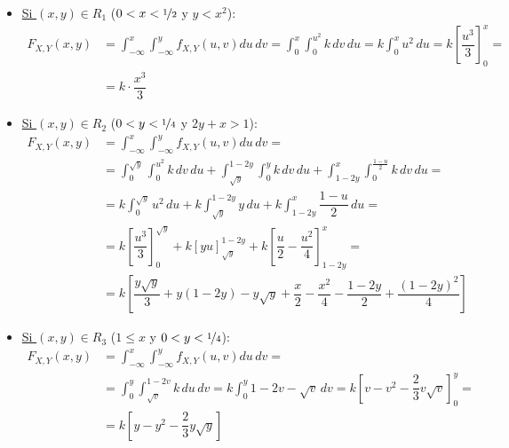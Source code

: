 \documentclass[12pt]{article}
\begin{document}
\begin{ejercicio}[5 puntos]
\begin{enumerate}
\begin{itemize}
                \item \ul{Si $(x,y) \in R_1$} ($0<x<\nicefrac{1}{2}$ y $y<x^2$):
                \begin{align*}
                    F_{X,Y}(x,y) &= \int_{-\infty}^x\int_{-\infty}^y f_{X,Y}(u,v)du\,dv
                    = \int_{0}^x\int_0^{u^2} k\,dv\,du
                    = k\int_{0}^x u^2\,du
                    = k\left[\dfrac{u^3}{3}\right]_{0}^x
                    =\\&= k\cdot \dfrac{x^3}{3}
                \end{align*}

                \item \ul{Si $(x,y) \in R_2$} ($0<y<\nicefrac{1}{4}$ y $2y+x>1$):
                \begin{align*}
                    F_{X,Y}(x,y) &= \int_{-\infty}^x\int_{-\infty}^y f_{X,Y}(u,v)du\,dv
                    =\\&= \int_0^{\sqrt{y}}\int_{0}^{u^2} k\,dv\,du
                    + \int_{\sqrt{y}}^{1-2y}\int_{0}^{y} k\,dv\,du
                    + \int_{1-2y}^x\int_{0}^{\frac{1-u}{2}} k\,dv\,du
                    =\\&= k\int_0^{\sqrt{y}}u^2\,du
                    + k\int_{\sqrt{y}}^{1-2y}y\,du
                    + k\int_{1-2y}^x \dfrac{1-u}{2}\,du
                    =\\&= k\left[\dfrac{u^3}{3}\right]_{0}^{\sqrt{y}}
                    + k\left[yu\right]_{\sqrt{y}}^{1-2y}
                    + k\left[\dfrac{u}{2}-\dfrac{u^2}{4}\right]_{1-2y}^x
                    =\\&= k\left[\dfrac{y\sqrt{y}}{3} + y(1-2y)-y\sqrt{y}+ \dfrac{x}{2}-\dfrac{x^2}{4}-\dfrac{1-2y}{2}+\dfrac{(1-2y)^2}{4}\right]
                \end{align*}

                \item \ul{Si $(x,y) \in R_3$} ($1\leq x$ y $0<y<\nicefrac{1}{4}$):
                \begin{align*}
                    F_{X,Y}(x,y) &= \int_{-\infty}^x\int_{-\infty}^y f_{X,Y}(u,v)du\,dv
                    =\\&= \int_0^{y}\int_{\sqrt{v}}^{1-2v} k\,du\,dv
                    = k\int_0^{y}1-2v-\sqrt{v}\,dv
                    = k\left[v-v^2-\dfrac{2}{3}v\sqrt{v}\right]_{0}^{y}
                    =\\&= k\left[y-y^2-\dfrac{2}{3}y\sqrt{y}\right]
                \end{align*}


\end{itemize}
\end{enumerate}
\end{ejercicio}
\end{document}
